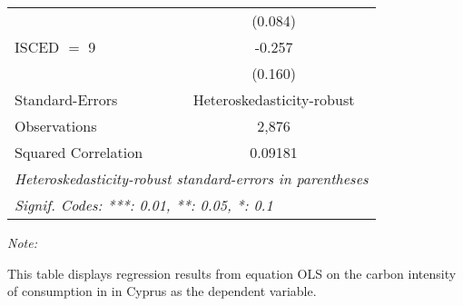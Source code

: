 \begin{table}[htbp!]
\begin{adjustbox}{width = 1\textwidth, max height = 0.95\textheight, center}
\begin{threeparttable}[b]
\begin{tabular}{lc}
                                & (0.084)\\   
            ISCED $=$ 9         & -0.257\\   
                                & (0.160)\\   
            \midrule 
            Standard-Errors     & Heteroskedasticity-robust \\   
            Observations        & 2,876\\  
            Squared Correlation & 0.09181\\  
            \midrule \midrule
            \multicolumn{2}{l}{\emph{Heteroskedasticity-robust standard-errors in parentheses}}\\
            \multicolumn{2}{l}{\emph{Signif. Codes: ***: 0.01, **: 0.05, *: 0.1}}\\
         \end{tabular}
         
         \begin{tablenotes}\item \medskip \textit{Note:}
            \item This table displays regression results from equation OLS on the carbon intensity of consumption in  in Cyprus as the dependent variable. 
         \end{tablenotes}
      \end{threeparttable}
   \end{adjustbox}
\end{table}


